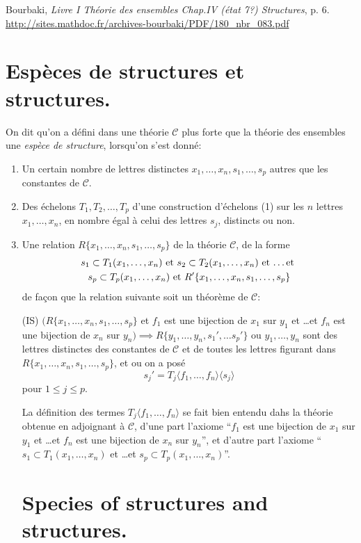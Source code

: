 \documentclass{article}
\newcommand{\C}{\mathcal{C}}
\begin{document}
\noindent
Bourbaki, \emph{Livre I Th\'eorie des ensembles Chap.IV (\'etat 7?)
  Structures}, p. 6.
\url{http://sites.mathdoc.fr/archives-bourbaki/PDF/180_nbr_083.pdf}

\section*{Esp\`eces de structures et structures.}

On dit qu'on a d\'efini dans une th\'eorie $\C$ plus forte que la
th\'eorie des ensembles une \emph{esp\`ece de structure}, lorsqu'on
s'est donn\'e:
\begin{enumerate}
\item Un certain nombre de lettres distinctes $x_1, \dots, x_n, s_1,
  \dots, s_p$ autres que les constantes de $\C$.
\item Des \'echelons $T_1, T_2, \dots, T_p$ d'une construction
  d'\'echelons (1) sur les $n$ lettres $x_1, \dots, x_n$, en nombre
  \'egal \`a celui des lettres $s_j$, distincts ou non.
\item Une relation $R\{x_1, \dots, x_n, s_1, \dots, s_p\}$ de la
  th\'eorie $\C$, de la forme
  \begin{multline*}
    s_1 \subset T_1(x_1, \dots, x_n) \text{ et } s_2 \subset T_2(x_1,
    \dots, x_n) \text{ et \dots et } \\
    s_p \subset T_p(x_1, \dots, x_n) \text{ et } R'\{x_1, \dots, x_n,
    s_1, \dots, s_p\}
  \end{multline*}
de fa{\c c}on que la relation suivante soit un th\'eor\`eme de $\C$:

(IS) $(R\{x_1, \dots, x_n, s_1, \dots, s_p\}$ et $f_1$ est une
bijection de $x_1$ sur $y_1$ et \dots et $f_n$ est une bijection de
$x_n$ sur $y_n) \implies R\{y_1, \dots, y_n, s_1', \dots s_p'\}$ ou
$y_1, \dots, y_n$ sont des lettres distinctes des constantes de $\C$
et de toutes les lettres figurant dans $R\{x_1, \dots, x_n, s_1,
\dots, s_p\}$, et ou on a pos\'e \[ s_j' = T_j\langle f_1, \dots,
f_n\rangle \langle s_j \rangle \] pour $1 \leq j \leq p$.

La d\'efinition des termes $T_j\langle f_1, \dots, f_n\rangle$ se fait
bien entendu dahs la th\'eorie obtenue en adjoignant \`a $\C$, d'une
part l'axiome ``$f_1$ est une bijection de $x_1$ sur $y_1$ et \dots et
$f_n$ est une bijection de $x_n$ sur $y_n$'', et d'autre part l'axiome
``$s_1 \subset T_1(x_1, \dots, x_n)$ et \dots et $s_p \subset T_p(x_1,
\dots, x_n)$''.

\section*{Species of structures and structures.}


\end{enumerate}
\end{document}
